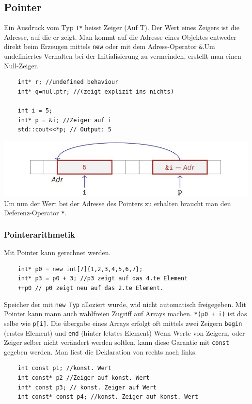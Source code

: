 \subsection{Pointer}
Ein Ausdruck vom Typ \texttt{T*} heisst Zeiger (Auf T). Der Wert eines Zeigers ist die Adresse, auf die er zeigt. Man kommt auf die Adresse eines Objektes entweder direkt beim Erzeugen mittels \texttt{new} oder mit dem Adress-Operator \texttt{\&}.Um undefiniertes Verhalten bei der Initialisierung zu vermeinden, erstellt man einen Null-Zeiger.
\begin{lstlisting}
	int* r; //undefined behaviour
	int* q=nullptr; //(zeigt explizit ins nichts)
	
	int i = 5;
	int* p = &i; //Zeiger auf i
	std::cout<<*p; // Output: 5
\end{lstlisting}
\includegraphics[width=0.24 \textwidth]{sections/pointer}
Um nun der Wert bei der Adresse des Pointers zu erhalten braucht man den Deferenz-Operator \texttt{*}.
\subsubsection{Pointerarithmetik}
Mit Pointer kann gerechnet werden.
\begin{lstlisting}
	int* p0 = new int[7]{1,2,3,4,5,6,7};
	int* p3 = p0 + 3; //p3 zeigt auf das 4.te Element
	++p0 // p0 zeigt neu auf das 2.te Element.
\end{lstlisting}
Speicher der mit \texttt{new Typ} alloziert wurde, wid nicht automatisch freigegeben. Mit Pointer kann mann auch wahlfreien Zugriff auf Arrays machen. \texttt{*(p0 + i)} ist das selbe wie \texttt{p[i]}. Die übergabe eines Arrays erfolgt oft mittels zwei Zeigern \texttt{begin} (erstes Element) und \texttt{end} (hinter letztes Element)
Wenn Werte von Zeigern, oder Zeiger selber nicht verändert werden soltlen, kann diese Garantie mit \texttt{const} gegeben werden. Man liest die Deklaration von rechts nach links.
\begin{lstlisting}
	int const p1; //konst. Wert
	int const* p2 //Zeiger auf konst. Wert
	int* const p3; // konst. Zeiger auf Wert
	int const* const p4; //konst. Zeiger auf konst. Wert
	
\end{lstlisting}




